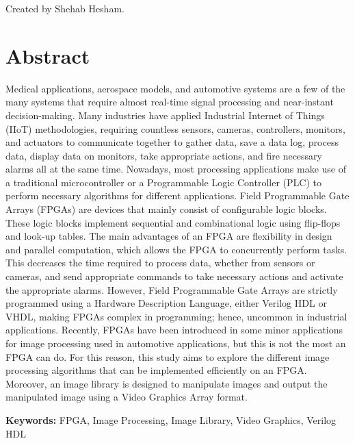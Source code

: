 	Created by Shehab Hesham.

\chapter*{Abstract}

Medical applications, aerospace models, and automotive systems are a few of the many systems that require almost real-time signal processing and near-instant decision-making. Many industries have applied Industrial Internet of Things (IIoT) methodologies, requiring countless sensors, cameras, controllers, monitors, and actuators to communicate together to gather data, save a data log, process data, display data on monitors, take appropriate actions, and fire necessary alarms all at the same time. Nowadays, most processing applications make use of a traditional microcontroller or a Programmable Logic Controller (PLC) to perform necessary algorithms for different applications. Field Programmable Gate Arrays (FPGAs) are devices that mainly consist of configurable logic blocks. These logic blocks implement sequential and combinational logic using flip-flops and look-up tables. The main advantages of an FPGA are flexibility in design and parallel computation, which allows the FPGA to concurrently perform tasks. This decreases the time required to process data, whether from sensors or cameras, and send appropriate commands to take necessary actions and activate the appropriate alarms. However, Field Programmable Gate Arrays are strictly programmed using a Hardware Description Language, either Verilog HDL or VHDL, making FPGAs complex in programming; hence, uncommon in industrial applications. Recently, FPGAs have been introduced in some minor applications for image processing used in automotive applications, but this is not the most an FPGA can do. For this reason, this study aims to explore the different image processing algorithms that can be implemented efficiently on an FPGA. Moreover, an image library is designed to manipulate images and output the manipulated image using a Video Graphics Array format.           \newline

\textbf{Keywords:} FPGA, Image Processing, Image Library, Video Graphics, Verilog HDL




%
